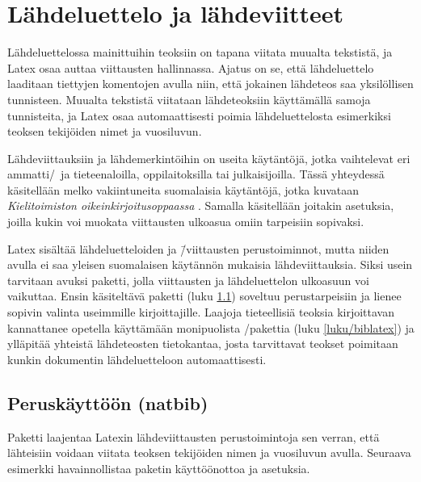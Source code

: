 \section{Lähdeluettelo ja lähdeviitteet}
\label{luku/lähteet}

Lähdeluettelossa mainittuihin teoksiin on tapana viitata muualta
tekstistä, ja Latex osaa auttaa viittausten hallinnassa. Ajatus on se,
että lähdeluettelo laaditaan tiettyjen komentojen avulla niin, että
jokainen lähdeteos saa yksilöllisen tunnisteen. Muualta tekstistä
viitataan lähdeteoksiin käyttämällä samoja tunnisteita, ja Latex osaa
automaattisesti poimia lähdeluettelosta esimerkiksi teoksen tekijöiden
nimet ja vuosiluvun.

Lähdeviittauksiin ja lähdemerkintöihin on useita käytäntöjä, jotka
vaihtelevat eri ammatti\-/\ ja tieteenaloilla, oppilaitoksilla tai
julkaisijoilla. Tässä yhteydessä käsitellään melko vakiintuneita
suomalaisia käytäntöjä, jotka kuvataan \emph{Kielitoimiston
  oikeinkirjoitusoppaassa} \parencite{kt_oik}. Samalla käsitellään
joitakin asetuksia, joilla kukin voi muokata viittausten ulkoasua omiin
tarpeisiin sopivaksi.

Latex sisältää lähdeluetteloiden ja \=/viittausten perustoiminnot, mutta
niiden avulla ei saa yleisen suomalaisen käytännön mukaisia
lähdeviittauksia. Siksi usein tarvitaan avuksi paketti, jolla
viittausten ja lähdeluettelon ulkoasuun voi vaikuttaa. Ensin käsiteltävä
paketti  (luku \ref{luku/natbib}) soveltuu
perustarpeisiin ja lienee sopivin valinta useimmille kirjoittajille.
Laajoja tieteellisiä teoksia kirjoittavan kannattanee opetella
käyttämään monipuolista \-/pakettia (luku
\ref{luku/biblatex}) ja ylläpitää yhteistä lähdeteosten tietokantaa,
josta tarvittavat teokset poimitaan kunkin dokumentin lähdeluetteloon
automaattisesti.

\subsection{Peruskäyttöön (natbib)}
\label{luku/natbib}

Paketti  laajentaa Latexin lähdeviittausten
perustoimintoja sen verran, että lähteisiin voidaan viitata teoksen
tekijöiden nimen ja vuosiluvun avulla. Seuraava esimerkki
havainnollistaa paketin käyttöönottoa ja asetuksia.

\begin{koodilohkosis}
\usepackage{natbib}
\end{koodilohkosis}

